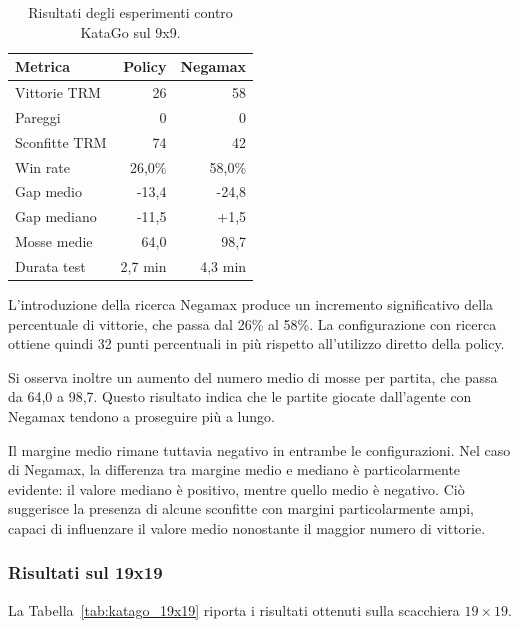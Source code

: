 \begin{table}[htbp]
    \centering
    \caption{Risultati degli esperimenti contro KataGo sul 9x9.}
    \label{tab:katago_9x9}
    \begin{tabular}{lrr}
        \hline
        \textbf{Metrica} & \textbf{Policy} & \textbf{Negamax} \\
        \hline
        Vittorie TRM     & 26              & 58               \\
        Pareggi          & 0               & 0                \\
        Sconfitte TRM    & 74              & 42               \\
        Win rate         & 26,0\%          & 58,0\%           \\
        Gap medio        & -13,4           & -24,8            \\
        Gap mediano      & -11,5           & +1,5             \\
        Mosse medie      & 64,0            & 98,7             \\
        Durata test      & 2,7 min         & 4,3 min          \\
        \hline
    \end{tabular}
\end{table}

L'introduzione della ricerca Negamax produce un incremento significativo della percentuale di vittorie, che passa dal 26\% al 58\%. La configurazione con ricerca ottiene quindi 32 punti percentuali in più rispetto all'utilizzo diretto della policy.

Si osserva inoltre un aumento del numero medio di mosse per partita, che passa da 64,0 a 98,7. Questo risultato indica che le partite giocate dall'agente con Negamax tendono a proseguire più a lungo.

Il margine medio rimane tuttavia negativo in entrambe le configurazioni. Nel caso di Negamax, la differenza tra margine medio e mediano è particolarmente evidente: il valore mediano è positivo, mentre quello medio è negativo. Ciò suggerisce la presenza di alcune sconfitte con margini particolarmente ampi, capaci di influenzare il valore medio nonostante il maggior numero di vittorie.

\subsubsection{Risultati sul 19x19}

La Tabella~\ref{tab:katago_19x19} riporta i risultati ottenuti sulla scacchiera $19 \times 19$.

